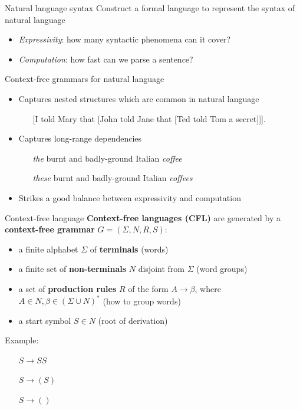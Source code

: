 \documentclass[usenames,dvipsnames,notes,11pt,aspectratio=169]{beamer}
\begin{document}
\begin{frame}
    {Natural language syntax}
    Construct a formal language to represent the syntax of natural language\\
    \begin{itemize}
        \item \emph{Expressivity}: how many syntactic phenomena can it cover?
        \item \emph{Computation}: how fast can we parse a sentence?
    \end{itemize}

    Context-free grammars for natural language\\
    \begin{itemize}
        \item Captures nested structures which are common in natural language 
            \begin{itemize}
                \item[] [I told Mary that [John told Jane that [Ted told Tom a secret]]].
            \end{itemize}
        \item Captures long-range dependencies
            \begin{itemize}
                \item[] \emph{the} burnt and badly-ground Italian \emph{coffee}
                \item[] \emph{these} burnt and badly-ground Italian \emph{coffees}
            \end{itemize}
        \item Strikes a good balance between expressivity and computation
    \end{itemize}
\end{frame}

\begin{frame}
    {Context-free language}
    \textbf{Context-free languages (CFL)} are generated by a \textbf{context-free grammar} $G=(\Sigma, N, R, S)$:\\
    \begin{itemize}
        \item a finite alphabet $\Sigma$ of \textbf{terminals} (words)
        \item a finite set of \textbf{non-terminals} $N$ disjoint from $\Sigma$ (word groups)
        \item a set of \textbf{production rules} $R$ of the form $A\rightarrow\beta$,
            where $A \in N, \beta \in (\Sigma \cup N)^*$ (how to group words)
        \item a start symbol $S\in N$ (root of derivation)
    \end{itemize}

    Example:\\
    \begin{itemize}
        \item[] $S\rightarrow SS$
        \item[] $S\rightarrow (S)$
        \item[] $S\rightarrow ()$
    \end{itemize}
\end{frame}
\end{document}
